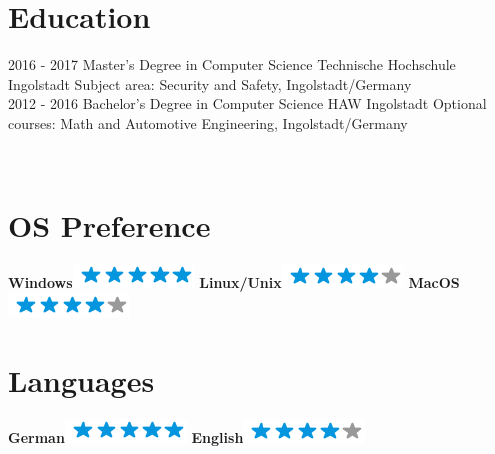\documentclass[]{friggeri-cv}
\begin{document}
\section{Education}
\begin{entrylist}
  \entry
    {2016 - 2017}
    {Master's Degree in Computer Science}
    {Technische Hochschule Ingolstadt}
    {Subject area: Security and Safety, Ingolstadt/Germany\\}
  \entry
    {2012 - 2016}
    {Bachelor's Degree in Computer Science}
    {HAW Ingolstadt}
    {Optional courses: Math and Automotive Engineering, Ingolstadt/Germany}
\end{entrylist}

\newpage

\begin{aside}
~
~
  \section{OS Preference}
  \textbf{Windows}\includegraphics[scale=0.40]{img/5stars.png}
    \textbf{Linux/Unix}\includegraphics[scale=0.40]{img/4stars.png}
    \textbf{MacOS}\includegraphics[scale=0.40]{img/4stars.png}
    ~
    \section{Languages}
    \textbf{German}\includegraphics[scale=0.40]{img/5stars.png}
    \textbf{English}\includegraphics[scale=0.40]{img/4stars.png}
    ~

\end{aside}
\end{document}
